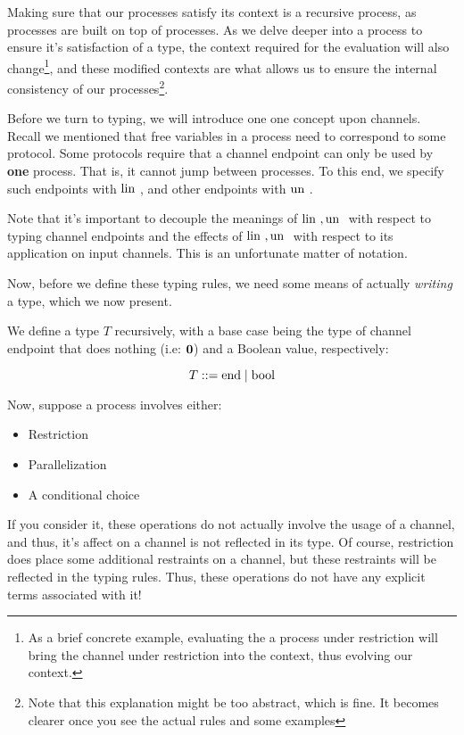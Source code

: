 Making sure that our processes satisfy its context is a recursive process, as processes are built on top of processes. As we delve deeper into a process to ensure it's satisfaction of a type, the context required for the evaluation will also change\footnote{As a brief concrete example, evaluating the a process under restriction will bring the channel under restriction into the context, thus evolving our context.}, and these modified contexts are what allows us to ensure the internal consistency of our processes\footnote{Note that this explanation might be too abstract, which is fine. It becomes clearer once you see the actual rules and some examples}.

Before we turn to typing, we will introduce one one concept upon channels. Recall we mentioned that free variables in a process need to correspond to some protocol. Some protocols require that a channel endpoint can only be used by \textbf{one} process. That is, it cannot jump between processes. To this end, we specify such endpoints with $\text{lin }$, and other endpoints with $\text{un }$.

Note that it's important to decouple the meanings of $\text{lin }, \text{un }$ with respect to typing channel endpoints and the effects of $\text{lin }, \text{un }$ with respect to its application on input channels. This is an unfortunate  matter of notation.

Now, before we define these typing rules, we need some means of actually \textit{writing} a type, which we now present.

We define a type $T$ recursively, with a base case being the type of channel endpoint that does nothing (i.e: $\textbf{0}$) and a Boolean value, respectively:

$$
T ::= \text{end} \mid \text{bool}
$$

Now, suppose a process involves either:
\begin{itemize}
    \item Restriction
    \item Parallelization
    \item A conditional choice
\end{itemize}

If you consider it, these operations do not actually involve the usage of a channel, and thus, it's affect on a channel is not reflected in its type. Of course, restriction does place some additional restraints on a channel, but these restraints will be reflected in the typing rules. Thus, these operations do not have any explicit terms associated with it!

